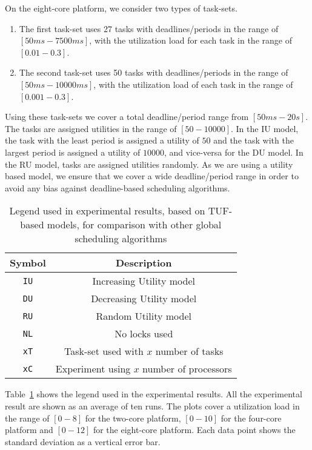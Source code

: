 \documentclass[12pt,dvips]{report}
\begin{document}
On the eight-core platform, we consider two types of task-sets.
\begin{enumerate}
	\item The first task-set uses 27 tasks with deadlines/periods in the range of $[50ms-7500ms]$, with the utilization load for each task in the range of $[0.01-0.3]$.
	\item The second task-set uses 50 tasks with deadlines/periods in the range of $[50ms-10000ms]$, with the utilization load of each task in the range of $[0.001-0.3]$.
\end{enumerate}

Using these task-sets we cover a total deadline/period range from $[50ms-20s]$. The tasks are assigned utilities in the range of $[50-10000]$. In the IU model, the task with the least period is assigned a utility of $50$ and the task with the largest period is assigned a utility of $10000$, and vice-versa for the DU model. In the RU model, tasks are assigned utilities randomly. As we are using a utility based model, we ensure that we cover a wide deadline/period range in order to avoid any bias against deadline-based scheduling algorithms.

\begin{table} [htbp]
\caption{Legend used in experimental results, based on TUF-based models, for comparison with other global scheduling algorithms}
\label{tab:tuf-legend}
\begin{center}
\begin{tabular}{c c}
\hline
Symbol & Description \\ \hline
\texttt{IU} & Increasing Utility model \\
\texttt{DU} & Decreasing Utility model  \\
\texttt{RU} & Random Utility model  \\
\texttt{NL} & No locks used \\
\texttt{xT} & Task-set used with $x$ number of tasks \\
\texttt{xC} & Experiment using $x$ number of processors\\
\hline
\end{tabular}
\end{center}
\end{table}

Table~\ref{tab:tuf-legend} shows the legend used in the experimental results. All the experimental result are shown as an average of ten runs. 
The plots cover a utilization load in the range of $[0-8]$ for the two-core platform, $[0-10]$ for the four-core platform and $[0-12]$ for the eight-core platform. Each data point shows the standard deviation as a vertical error bar. 
\end{document}
